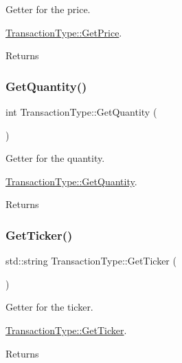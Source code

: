 Getter for the price. 

\mbox{\hyperlink{class_transaction_type_ac139f76c5ae460bd9c1c87570c6bee34}{Transaction\+Type\+::\+Get\+Price}}.

\begin{DoxyReturn}{Returns}

\end{DoxyReturn}
\mbox{\label{class_transaction_type_a2b81258ca5237f8c07e2bdd43f0ffde1}} 
\subsubsection{\texorpdfstring{Get\+Quantity()}{GetQuantity()}}
{\footnotesize\ttfamily int Transaction\+Type\+::\+Get\+Quantity (\begin{DoxyParamCaption}{ }\end{DoxyParamCaption})}



Getter for the quantity. 

\mbox{\hyperlink{class_transaction_type_a2b81258ca5237f8c07e2bdd43f0ffde1}{Transaction\+Type\+::\+Get\+Quantity}}.

\begin{DoxyReturn}{Returns}

\end{DoxyReturn}
\mbox{\label{class_transaction_type_a88fd57a09996e67178256cd8e76cb3e4}} 
\subsubsection{\texorpdfstring{Get\+Ticker()}{GetTicker()}}
{\footnotesize\ttfamily std\+::string Transaction\+Type\+::\+Get\+Ticker (\begin{DoxyParamCaption}{ }\end{DoxyParamCaption})}



Getter for the ticker. 

\mbox{\hyperlink{class_transaction_type_a88fd57a09996e67178256cd8e76cb3e4}{Transaction\+Type\+::\+Get\+Ticker}}.

\begin{DoxyReturn}{Returns}

\end{DoxyReturn}
\mbox{\label{class_transaction_type_a2253c4366ecd89e2f4d31888527e47dc}} 
